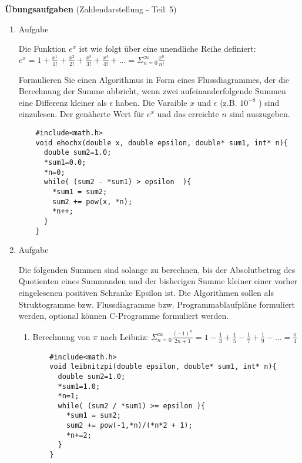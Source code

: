 \documentclass[12pt,a4paper]{scrreprt}
\begin{document}
\large{\textbf{Übungsaufgaben} (Zahlendarstellung - Teil~5)}

\begin{enumerate}

\item Aufgabe %

Die Funktion $ e^x $ ist wie folgt über eine unendliche Reihe definiert: \\

\begin{math}
e^x = 1 + \frac{x^1}{1!} + \frac{x^2}{2!} + \frac{x^3}{3!} + \frac{x^4}{4!} + ...
= \Sigma_{n=0}^{\infty} \frac{x^n}{n!}
\end{math}

\par Formulieren Sie einen Algorithmus in Form eines Flussdiagrammes, der die Berechnung der Summe abbricht, wenn zwei aufeinanderfolgende Summen eine Differenz kleiner als $\epsilon$ haben.
Die Varaible $x$ und $\epsilon$ (z.B. $10^{-8}$ ) sind einzulesen. Der genäherte Wert für $ e^x $ und das erreichte $ n $ sind auszugeben.

\begin{lstlisting}
    #include<math.h>
    void ehochx(double x, double epsilon, double* sum1, int* n){
      double sum2=1.0;
      *sum1=0.0;
      *n=0;
      while( (sum2 - *sum1) > epsilon  ){
        *sum1 = sum2;
        sum2 += pow(x, *n);
        *n++;
      }
    }
\end{lstlisting}

\item Aufgabe %

Die folgenden Summen sind solange zu berechnen, bis der Absolutbetrag des Quotienten eines Summanden und der bisherigen Summe kleiner einer vorher eingelesenen positiven Schranke Epsilon ist. Die Algorithmen sollen als Struktogramme bzw. Flussdiagramme bzw. Programmablaufpläne formuliert werden, optional können C-Programme formuliert werden.

\begin{enumerate}

\item Berechnung von $\pi$ nach Leibniz: $ \Sigma_{n=0}^{\infty} \frac{(-1)^n}{2n+1} = 1-\frac{1}{3}+\frac{1}{5}-\frac{1}{7}+\frac{1}{9}-\ldots=\frac{\pi}{4} $

\begin{lstlisting}
    #include<math.h>
    void leibnitzpi(double epsilon, double* sum1, int* n){
      double sum2=1.0;
      *sum1=1.0;
      *n=1;
      while( (sum2 / *sum1) >= epsilon ){
        *sum1 = sum2;
        sum2 += pow(-1,*n)/(*n*2 + 1);
        *n+=2;
      }
    }
\end{lstlisting}


\end{enumerate}
\end{enumerate}
\end{document}
